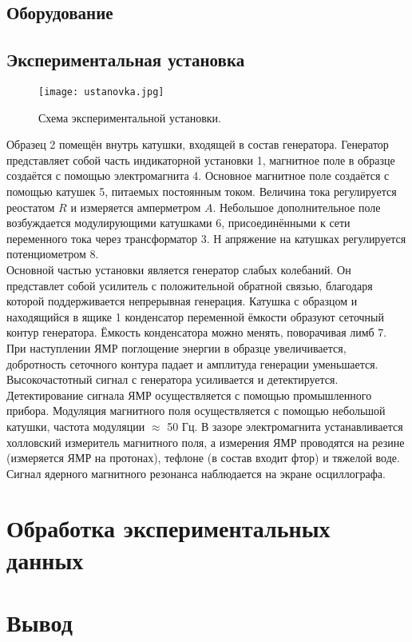 \documentclass[a4paper, 14pt]{article}
\begin{document}
\subsection*{\textcolor{sub_header}{Оборудование}}


\subsection*{\textcolor{sub_header}{Экспериментальная установка}}

\begin{figure}[htbp]
    \centering
    \texttt{[image: ustanovka.jpg]}
    \caption{Схема экспериментальной установки.}
    \label{fig:ustanovka}
\end{figure}

Образец 2 помещён внутрь катушки, входящей в состав генератора. 
Генератор представляет собой часть индикаторной установки 1, магнитное поле в образце создаётся с помощью электромагнита 4.
Основное магнитное поле создаётся с помощью катушек 5, питаемых постоянным током.
Величина тока регулируется реостатом $R$ и измеряется амперметром $A$. 
Небольшое дополнительное поле возбуждается модулирующими катушками 6, присоединёнными к сети переменного тока через трансформатор 3. Н
апряжение на катушках регулируется потенциометром 8.\\
Основной частью установки является генератор слабых колебаний.
Он представлет собой усилитель с положительной обратной связью, благодаря которой поддерживается непрерывная генерация.
Катушка с образцом и находящийся в ящике 1 конденсатор переменной ёмкости образуют сеточный контур генератора. 
Ёмкость конденсатора можно менять, поворачивая лимб 7. 
При наступлении ЯМР поглощение энергии в образце увеличивается, добротность сеточного контура падает и амплитуда генерации уменьшается. 
Высокочастотный сигнал с генератора усиливается и детектируется.\\
Детектирование сигнала ЯМР осуществляется с помощью промышленного прибора. Модуляция магнитного поля осуществляется с помощью небольшой катушки, частота модуляции $\approx$ 50 Гц. В зазоре электромагнита устанавливается холловский измеритель магнитного поля, а измерения ЯМР проводятся на резине (измеряется ЯМР на протонах), тефлоне (в состав входит фтор) и тяжелой воде.\\
Сигнал ядерного магнитного резонанса наблюдается на экране осциллографа.




\section*{\textcolor{header}{Обработка экспериментальных данных}}



\section*{\textcolor{header}{Вывод}}
\end{document}
